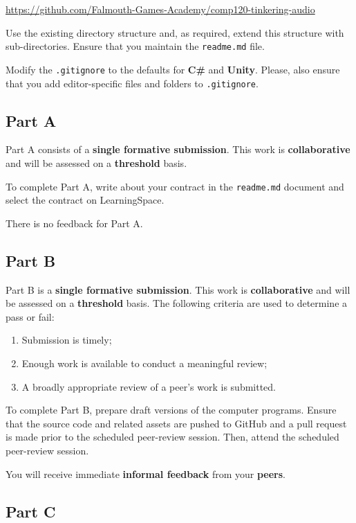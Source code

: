 \documentclass{../../fal_assignment}
\begin{document}
\indent \url{https://github.com/Falmouth-Games-Academy/comp120-tinkering-audio}

Use the existing directory structure and, as required, extend this structure with sub-directories. Ensure that you maintain the \texttt{readme.md} file.

Modify the \texttt{.gitignore} to the defaults for \textbf{C\#} and \textbf{Unity}. Please, also ensure that you add editor-specific files and folders to \texttt{.gitignore}. 

\subsection*{Part A}

Part A consists of a \textbf{single formative submission}. This work is \textbf{collaborative} and will be assessed on a \textbf{threshold} basis. 

To complete Part A, write about your contract in the \texttt{readme.md} document and select the contract on LearningSpace.

There is no feedback for Part A.

\subsection*{Part B}

Part B is a \textbf{single formative submission}. This work is \textbf{collaborative} and will be assessed on a \textbf{threshold} basis. The following criteria are used to determine a pass or fail:

\begin{enumerate}[label=(\alph*)]
	\item Submission is timely;
	\item Enough work is available to conduct a meaningful review;
	\item A broadly appropriate review of a peer's work is submitted.
\end{enumerate}

To complete Part B, prepare draft versions of the computer programs. Ensure that the source code and related assets are pushed to GitHub and a pull request is made prior to the scheduled peer-review session. Then, attend the scheduled peer-review session.

You will receive immediate \textbf{informal feedback} from your \textbf{peers}.

\subsection*{Part C}
\end{document}
